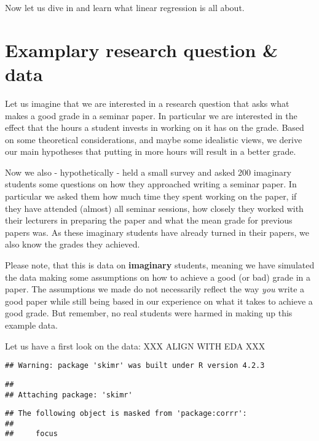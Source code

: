 \documentclass[
]{book}
\begin{document}
Now let us dive in and learn what linear regression is all about.

\hypertarget{examplary-research-question-data}{%
\section{Examplary research question \& data}\label{examplary-research-question-data}}

Let us imagine that we are interested in a research question that asks what
makes a good grade in a seminar paper. In particular we are interested in the
effect that the hours a student invests in working on it has on the grade. Based
on some theoretical considerations, and maybe some idealistic views, we derive
our main hypotheses that putting in more hours will result in a better grade.

Now we also - hypothetically - held a small survey and asked 200 imaginary
students some questions on how they approached writing a seminar paper. In
particular we asked them how much time they spent working on the paper, if they
have attended (almost) all seminar sessions, how closely they worked with their
lecturers in preparing the paper and what the mean grade for previous papers
was. As these imaginary students have already turned in their papers, we also
know the grades they achieved.

Please note, that this is data on \textbf{imaginary} students, meaning we have
simulated the data making some assumptions on how to achieve a good (or bad)
grade in a paper. The assumptions we made do not necessarily reflect the way
\emph{you} write a good paper while still being based in our experience on what it
takes to achieve a good grade. But remember, no real students were harmed in
making up this example data.

Let us have a first look on the data:
XXX ALIGN WITH EDA XXX

\begin{verbatim}
## Warning: package 'skimr' was built under R version 4.2.3
\end{verbatim}

\begin{verbatim}
## 
## Attaching package: 'skimr'
\end{verbatim}

\begin{verbatim}
## The following object is masked from 'package:corrr':
## 
##     focus
\end{verbatim}
\end{document}
